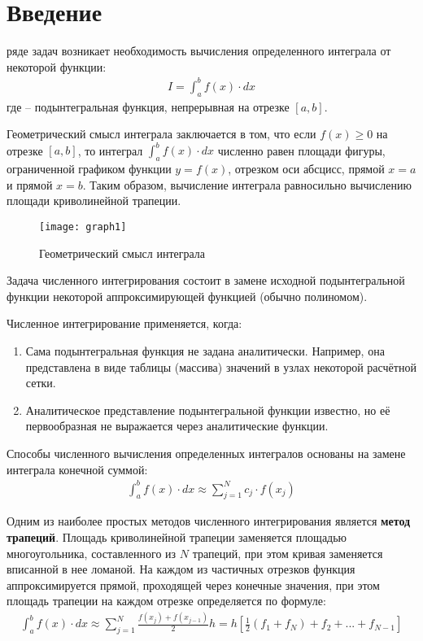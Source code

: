 \documentclass{report}
\begin{document}
\setcounter{page}{2}

\tableofcontents
\newpage

\section*{Введение}
 ряде задач возникает необходимость вычисления определенного интеграла от некоторой функции:
\begin{align*}
    I = \int_{a}^{b}f(x)\cdot dx
\end{align*}
где  – подынтегральная функция, непрерывная на отрезке $[a,b]$.
     
\par Геометрический смысл интеграла заключается в том, что если $f(x)\ge 0$ на отрезке $[a,b]$, то интеграл $\int_{a}^{b}f(x)\cdot dx$ численно равен площади фигуры, ограниченной графиком функции $y=f(x)$, отрезком оси абсцисс, прямой $x = a$ и прямой $x = b$. Таким образом, вычисление интеграла равносильно вычислению площади криволинейной трапеции.

\begin{figure}[hp]
    \centering
    \texttt{[image: graph1]}
    \caption{Геометрический смысл интеграла}
\end{figure}

\par Задача численного интегрирования состоит в замене исходной подынтегральной функции некоторой аппроксимирующей функцией (обычно полиномом).
\par Численное интегрирование применяется, когда:
\begin{enumerate}
    \item Сама подынтегральная функция не задана аналитически. Например, она представлена в виде таблицы (массива) значений в узлах некоторой расчётной сетки.
    \item Аналитическое представление подынтегральной функции известно, но её первообразная не выражается через аналитические функции.
\end{enumerate}

Способы численного вычисления определенных интегралов основаны на замене интеграла конечной суммой:
\begin{align*}
    \int_{a}^{b}f(x)\cdot dx \approx \sum_{j=1}^{N}c_{j} \cdot f(x_{j})
\end{align*}

\par Одним из наиболее простых методов численного интегрирования является \textbf{метод трапеций}. Площадь криволинейной трапеции заменяется площадью многоугольника, составленного из $N$ трапеций, при этом кривая заменяется вписанной в нее ломаной. На каждом из частичных отрезков функция аппроксимируется прямой, проходящей через конечные значения, при этом площадь трапеции на каждом отрезке определяется по формуле:
\begin{align*}
    \int_{a}^{b}f(x)\cdot dx \approx \sum_{j=1}^{N} \frac{f(x_j)+f(x_{j-1})}{2}h=h\left[ \frac{1}{2}(f_1+f_N)+f_2+...+f_{N-1} \right]
\end{align*}
\end{document}
